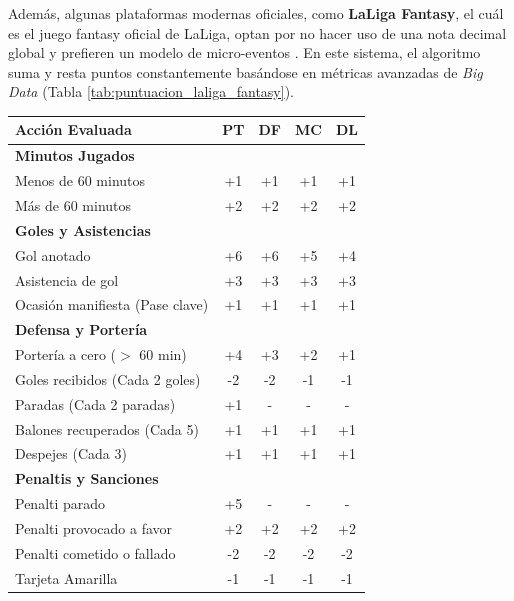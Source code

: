 Además, algunas plataformas modernas oficiales, como \textbf{LaLiga Fantasy}, el cuál es el juego fantasy oficial de LaLiga, optan por no hacer uso de una nota decimal global y prefieren un modelo de micro-eventos \cite{reglas_laligafantasy}. En este sistema, el algoritmo suma y resta puntos constantemente basándose en métricas avanzadas de \textit{Big Data} (Tabla \ref{tab:puntuacion_laliga_fantasy}).

\begin{table}[H]
    \centering
    \small
    \begin{tabular}{|p{4.5cm}|c|c|c|c|}
        \hline
        \textbf{Acción Evaluada} & \textbf{PT} & \textbf{DF} & \textbf{MC} & \textbf{DL} \\
        \hline
        \textbf{Minutos Jugados} & \multicolumn{4}{c|}{} \\ \hline
        Menos de 60 minutos & +1 & +1 & +1 & +1 \\ \hline
        Más de 60 minutos & +2 & +2 & +2 & +2 \\ \hline
        \textbf{Goles y Asistencias} & \multicolumn{4}{c|}{} \\ \hline
        Gol anotado & +6 & +6 & +5 & +4 \\ \hline
        Asistencia de gol & +3 & +3 & +3 & +3 \\ \hline
        Ocasión manifiesta (Pase clave) & +1 & +1 & +1 & +1 \\ \hline
        \textbf{Defensa y Portería} & \multicolumn{4}{c|}{} \\ \hline
        Portería a cero ($>$ 60 min) & +4 & +3 & +2 & +1 \\ \hline
        Goles recibidos (Cada 2 goles) & -2 & -2 & -1 & -1 \\ \hline
        Paradas (Cada 2 paradas) & +1 & - & - & - \\ \hline
        Balones recuperados (Cada 5) & +1 & +1 & +1 & +1 \\ \hline
        Despejes (Cada 3) & +1 & +1 & +1 & +1 \\ \hline
        \textbf{Penaltis y Sanciones} & \multicolumn{4}{c|}{} \\ \hline
        Penalti parado & +5 & - & - & - \\ \hline
        Penalti provocado a favor & +2 & +2 & +2 & +2 \\ \hline
        Penalti cometido o fallado & -2 & -2 & -2 & -2 \\ \hline
        Tarjeta Amarilla & -1 & -1 & -1 & -1 \\ \hline

\end{tabular}
\end{table}
